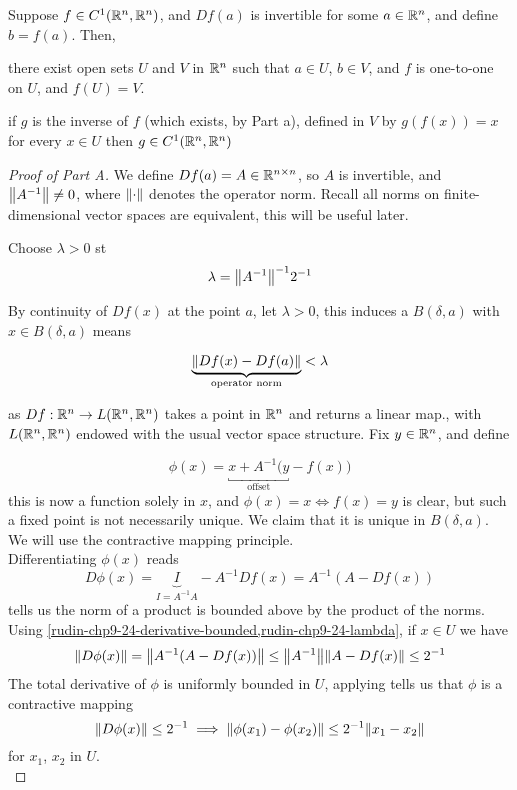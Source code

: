 \documentclass[../main-manifolds.tex]{subfiles}
\begin{document}

\begin{wts}\label{rudin-chp4-theorem-9.24}
    Suppose $f\in C^1({\mathbb{R}^n},{\mathbb{R}^n})$, and $Df(a)$ is invertible for some $a\in{\mathbb{R}^n}$, and define $b=f(a)$. Then,
\begin{enumalpha}
    \item there exist open sets $U$ and $V$ in ${\mathbb{R}^n}$ such that $a\in U$, $b\in V$, and $f$ is one-to-one on $U$, and $f(U)=V$.
    \item if $g$ is the inverse of $f$ (which exists, by Part a), defined in $V$ by $g(f(x))=x$ for every $x\in U$
    then $g\in C^1({\mathbb{R}^n},{\mathbb{R}^n})$
\end{enumalpha}
\end{wts}
\begin{proof}[Proof of Part A]
    We define $Df(a) = A\in\mathbb{R}^{n\times n}$, so $A$ is invertible, and $\norm{A^{-1}}\neq 0$, where $\norm{\cdot}$ denotes the operator norm. Recall all norms on finite-dimensional vector spaces are equivalent, this will be useful later.

    Choose $\lambda > 0$ st
    \begin{equation}\label{rudin-chp9-24-lambda}
        \lambda = \norm{A^{-1}}^{-1}2^{-1}
    \end{equation}

    By continuity of $Df(x)$ at the point $a$, let $\lambda > 0$, this induces a $B(\delta, a)$ with $x\in B(\delta, a)$ means

    \begin{equation}\label{rudin-chp9-24-derivative-bounded}
        \underbrace{\norm{Df(x) - Df(a)}}_{\text{operator norm}}<\lambda
    \end{equation}

    as $Df: {\mathbb{R}^n}\to L({\mathbb{R}^n},{\mathbb{R}^n})$ takes a point in ${\mathbb{R}^n}$ and returns a linear map., with $L({\mathbb{R}^n},{\mathbb{R}^n})$ endowed with the usual vector space structure. Fix $y\in {\mathbb{R}^n}$, and define

    \[
        \phi(x) = \underbracket{x + A^{-1}(y}_{\text{offset}}-f(x))
    \]
    this is now a function solely in $x$, and $\phi(x)=x\iff f(x)=y$ is clear, but such a fixed point is not necessarily unique. We claim that it is unique in $B(\delta, a)$. We will use the contractive mapping principle.\\
    
    Differentiating $\phi(x)$ reads
    \[
        D\phi(x) = \underbrace{I}_{I = A^{-1}A} - A^{-1}Df(x) = A^{-1}(A-Df(x))
    \]
     tells us the norm of a product is bounded above by the product of the norms. Using \cref{rudin-chp9-24-derivative-bounded,rudin-chp9-24-lambda}, if $x\in U$ we have
    \[
        \norm{D\phi(x)} = \norm{A^{-1}(A-Df(x))}\leq \norm{A^{-1}}\norm{A-Df(x)}\leq 2^{-1}
    \]
    The total derivative of $\phi$ is uniformly bounded in $U$, applying  tells us that $\phi$ is a contractive mapping
    \[
        \norm{D\phi(x)}\leq 2^{-1}\implies \norm{\phi(x_1)-\phi(x_2)}\leq 2^{-1}\norm{x_1-x_2}
    \]
    for $x_1$, $x_2$ in $U$.\\


\end{proof}
\end{document}
